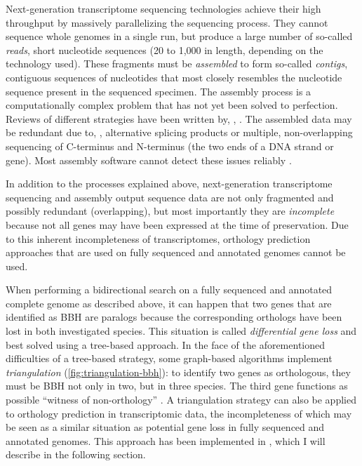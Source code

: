 Next-generation transcriptome sequencing technologies achieve their high
throughput by massively parallelizing the sequencing process. They cannot
sequence whole genomes in a single run, but produce a large number of so-called
\emph{reads}, short nucleotide sequences (20 to 1,000
 in length, depending on the technology used).
These fragments must be \emph{assembled} to form so-called \emph{contigs},
contiguous sequences of nucleotides that most closely resembles the nucleotide
sequence present in the sequenced specimen. The assembly process is a
computationally complex problem that has not yet been solved to perfection.
Reviews of different strategies have been written by, \eg, \citet{zhang2011}.
The assembled data may be redundant due to, \eg, alternative splicing products
\citep{black2003} or multiple, non-overlapping sequencing of C-terminus and
N-terminus (the two ends of a DNA strand or gene).  Most assembly software
cannot detect these issues reliably \citep{haiminen2011}. 

In addition to the processes explained above, next-generation transcriptome
sequencing and assembly output sequence data are not only fragmented and
possibly redundant (overlapping), but most importantly they are
\emph{incomplete} because not all genes may have been expressed at the time of
preservation. Due to this inherent incompleteness of transcriptomes, orthology
prediction approaches that are used on fully sequenced and annotated genomes
cannot be used.



When performing a bidirectional search on a fully sequenced and annotated
complete genome as described above, it can happen that two genes that are
identified as BBH are paralogs because the corresponding orthologs have been
lost in both investigated species. This situation is called \emph{differential
gene loss}\cite{altenhoff2012} and best solved using a tree-based approach. In
the face of the aforementioned difficulties of a tree-based strategy, some
graph-based algorithms implement \emph{triangulation}
(\autoref{fig:triangulation-bbh}): to identify two genes as orthologous, they
must be BBH not only in two, but in three species. The third gene functions as
possible ``witness of non-orthology'' \citep{dessimoz2006}. A triangulation
strategy can also be applied to orthology prediction in transcriptomic data, the
incompleteness of which may be seen as a similar situation as potential gene
loss in fully sequenced and annotated genomes. This approach has been
implemented in \hamstr \citep{ebersberger2009}, which I will describe in the
following section.
